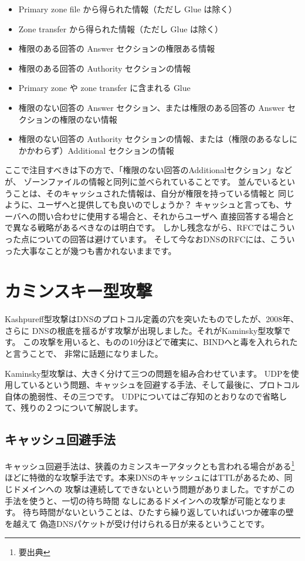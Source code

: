 \begin{itemize}
  \item Primary zone file から得られた情報（ただし Glue は除く）
  \item Zone transfer から得られた情報（ただし Glue は除く）
  \item 権限のある回答の Answer セクションの権限ある情報
  \item 権限のある回答の Authority セクションの情報
  \item Primary zone や zone transfer に含まれる Glue
  \item 権限のない回答の Answer セクション、または権限のある回答の Answer セクションの権限のない情報
  \item 権限のない回答の Authority セクションの情報、または（権限のあるなしにかかわらず）Additional セクションの情報
\end{itemize}

ここで注目すべきは下の方で、「権限のない回答のAdditionalセクション」などが、
ゾーンファイルの情報と同列に並べられていることです。
並んでいるということは、そのキャッシュされた情報は、自分が権限を持っている情報と
同じように、ユーザへと提供しても良いのでしょうか？
キャッシュと言っても、サーバへの問い合わせに使用する場合と、それからユーザへ
直接回答する場合とで異なる戦略があるべきなのは明白です。
しかし残念ながら、RFCではこういった点についての回答は避けています。
そして今なおDNSのRFCには、こういった大事なことが幾つも書かれないままです。


\section{カミンスキー型攻撃}
Kashpureff型攻撃はDNSのプロトコル定義の穴を突いたものでしたが、2008年、さらに
DNSの根底を揺るがす攻撃が出現しました。それがKaminsky型攻撃です。
この攻撃を用いると、ものの10分ほどで確実に、BINDへと毒を入れられたと言うことで、
非常に話題になりました。

Kaminsky型攻撃は、大きく分けて三つの問題を組み合わせています。
UDPを使用しているという問題、キャッシュを回避する手法、そして最後に、プロトコル
自体の脆弱性、その三つです。
UDPについてはご存知のとおりなので省略して、残りの２つについて解説します。

\subsection{キャッシュ回避手法}
キャッシュ回避手法は、狭義のカミンスキーアタックとも言われる場合がある\footnote{要出典}
ほどに特徴的な攻撃手法です。本来DNSのキャッシュにはTTLがあるため、同じドメインへの
攻撃は連続してできないという問題がありました。ですがこの手法を使うと、一切の待ち時間
なしにあるドメインへの攻撃が可能となります。
待ち時間がないということは、ひたすら繰り返していればいつか確率の壁を越えて
偽造DNSパケットが受け付けられる日が来るということです。

